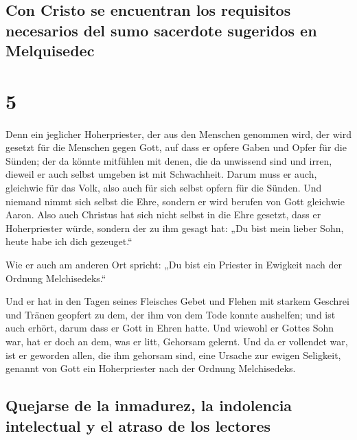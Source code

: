 \hypertarget{con-cristo-se-encuentran-los-requisitos-necesarios-del-sumo-sacerdote-sugeridos-en-melquisedec}{%
\subsection{Con Cristo se encuentran los requisitos necesarios del sumo
sacerdote sugeridos en
Melquisedec}\label{con-cristo-se-encuentran-los-requisitos-necesarios-del-sumo-sacerdote-sugeridos-en-melquisedec}}

\hypertarget{section-4}{%
\section{5}\label{section-4}}

 Denn ein jeglicher Hoherpriester, der aus den Menschen
genommen wird, der wird gesetzt für die Menschen gegen Gott, auf dass er
opfere Gaben und Opfer für die Sünden;  der da könnte
mitfühlen mit denen, die da unwissend sind und irren, dieweil er auch
selbst umgeben ist mit Schwachheit.  Darum muss er auch,
gleichwie für das Volk, also auch für sich selbst opfern für die Sünden.
 Und niemand nimmt sich selbst die Ehre, sondern er wird
berufen von Gott gleichwie Aaron.  Also auch Christus hat
sich nicht selbst in die Ehre gesetzt, dass er Hoherpriester würde,
sondern der zu ihm gesagt hat: „Du bist mein lieber Sohn, heute habe ich
dich gezeuget.``

 Wie er auch am anderen Ort spricht: „Du bist ein Priester
in Ewigkeit nach der Ordnung Melchisedeks.``

 Und er hat in den Tagen seines Fleisches Gebet und Flehen
mit starkem Geschrei und Tränen geopfert zu dem, der ihm von dem Tode
konnte aushelfen; und ist auch erhört, darum dass er Gott in Ehren
hatte.  Und wiewohl er Gottes Sohn war, hat er doch an
dem, was er litt, Gehorsam gelernt.  Und da er vollendet
war, ist er geworden allen, die ihm gehorsam sind, eine Ursache zur
ewigen Seligkeit,  genannt von Gott ein Hoherpriester
nach der Ordnung Melchisedeks.

\hypertarget{quejarse-de-la-inmadurez-la-indolencia-intelectual-y-el-atraso-de-los-lectores}{%
\subsection{Quejarse de la inmadurez, la indolencia intelectual y el
atraso de los
lectores}\label{quejarse-de-la-inmadurez-la-indolencia-intelectual-y-el-atraso-de-los-lectores}}


